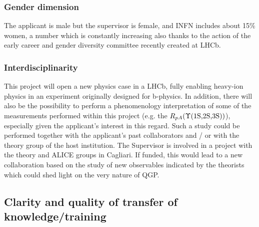 \documentclass[a4paper,11pt]{article}
\begin{document}
\subsubsection{Gender dimension}

The applicant is male but the supervisor is female, and INFN includes about 15\% women, a number which is constantly increasing also thanks to the action of the early career and gender diversity committee recently created at LHCb. 

\subsubsection{Interdisciplinarity}

This project will open a new physics case in a LHCb, fully enabling heavy-ion physics in an experiment originally designed for b-physics.
In addition, there will also be the possibility to perform a phenomenology interpretation of some of the measurements performed within this project (e.g. the $R_{pA}(\Upsilon\text{(1S,2S,3S)})$), especially given the applicant's interest in this regard. Such a study could be performed together with the applicant's past collaborators and / or with the theory group of the host institution. The Supervisor is involved in a project with the theory and ALICE  groups in Cagliari. If funded, this would lead to a new collaboration based on the study of new observables indicated by the theorists which could shed light on the very nature of QGP.

%       

\subsection{Clarity and quality of transfer of knowledge/training}

\end{document}
